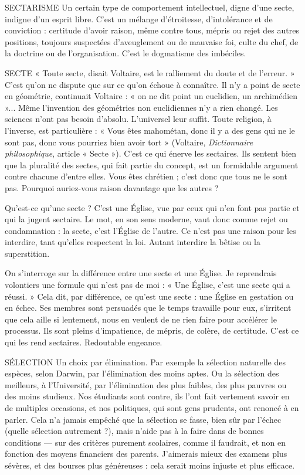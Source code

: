 SECTARISME Un certain type de comportement intellectuel, digne d’une
secte, indigne d’un esprit libre. C’est un mélange d’étroitesse,
d’intolérance et de conviction : certitude d’avoir raison, même contre tous,
mépris ou rejet des autres positions, toujours suspectées d’aveuglement ou de
mauvaise foi, culte du chef, de la doctrine ou de l’organisation. C’est le dogmatisme
des imbéciles.

SECTE  « Toute secte, disait Voltaire, est le ralliement du doute et de l’erreur. »
C’est qu’on ne dispute que sur ce qu’on échoue à connaître.
Il n’y a point de secte en géométrie, continuait Voltaire : « on ne dit point un
euclidien, un archimédien »... Même l'invention des géométries non euclidiennes
n’y a rien changé. Les sciences n’ont pas besoin d’absolu. L’universel
leur suffit. Toute religion, à l'inverse, est particulière : « Vous êtes mahométan,
donc il y a des gens qui ne le sont pas, donc vous pourriez bien avoir tort »
(Voltaire, {\it Dictionnaire philosophique}, article « Secte »). C’est ce qui énerve les
sectaires. Ils sentent bien que la pluralité des sectes, qui fait partie du concept,
est un formidable argument contre chacune d’entre elles. Vous êtes chrétien ;
c’est donc que tous ne le sont pas. Pourquoi auriez-vous raison davantage que
les autres ?

Qu'est-ce qu’une secte ? C’est une Église, vue par ceux qui n’en font pas
partie et qui la jugent sectaire. Le mot, en son sens moderne, vaut donc comme
rejet ou condamnation : la secte, c’est l’Église de l’autre. Ce n’est pas une raison
pour les interdire, tant qu’elles respectent la loi. Autant interdire la bêtise ou la
superstition.

On s'interroge sur la différence entre une secte et une Église. Je reprendrais
volontiers une formule qui n’est pas de moi : « Une Église, c’est une secte qui
a réussi. » Cela dit, par différence, ce qu’est une secte : une Église en gestation
ou en échec. Ses membres sont persuadés que le temps travaille pour eux, s’irritent
que cela aille si lentement, nous en veulent de ne rien faire pour accélérer
le processus. Ils sont pleins d’impatience, de mépris, de colère, de certitude.
C’est ce qui les rend sectaires. Redoutable engeance.

SÉLECTION Un choix par élimination. Par exemple la sélection naturelle
des espèces, selon Darwin, par l'élimination des moins aptes.
Ou la sélection des meilleurs, à l’Université, par l'élimination des plus faibles,
des plus pauvres ou des moins studieux. Nos étudiants sont contre, ils l'ont fait
vertement savoir en de multiples occasions, et nos politiques, qui sont gens
prudents, ont renoncé à en parler. Cela n’a jamais empêché que la sélection se
fasse, bien sûr par l'échec (quelle sélection autrement ?), mais n’aide pas à la
faire dans de bonnes conditions — sur des critères purement scolaires, comme il
faudrait, et non en fonction des moyens financiers des parents. J'aimerais
mieux des examens plus sévères, et des bourses plus généreuses : cela serait
moins injuste et plus efficace.

